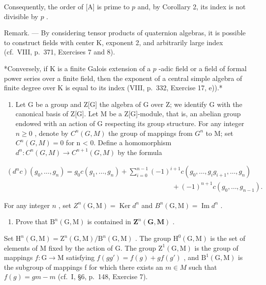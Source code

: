 Consequently, the order of {[}A{]} is prime to \(p\) and, by Corollary 2, its index is not divisible by \(p\) .

Remark. --- By considering tensor products of quaternion algebras, it is possible to construct fields with center K, exponent 2, and arbitrarily large index (cf.~VIII, p.~371, Exercises 7 and 8).

*Conversely, if K is a finite Galois extension of a \(p\) -adic field or a field of formal power series over a finite field, then the exponent of a central simple algebra of finite degree over K is equal to its index (VIII, p.~332, Exercise 17, e)).*


\begin{enumerate}
\def\labelenumi{\arabic{enumi})}
\tightlist
\item
  Let G be a group and Z{[}G{]} the algebra of G over Z; we identify G with the canonical basis of Z{[}G{]}. Let M be a Z{[}G{]}-module, that is, an abelian group endowed with an action of G respecting its group structure. For any integer \(n \geqslant 0\) , denote by \(C^{n}(G, M)\) the group of mappings from \(G^{n}\) to M; set \(C^{n}(G, M) = 0\) for n \textless{} 0. Define a homomorphism \(d^{n}: C^{n}(G, M) \to C^{n+1}(G, M)\) by the formula
\end{enumerate}

\[
\begin{array}{c} (d ^ {n} c) (g _ {0}, \ldots , g _ {n}) = g _ {0}   c (g _ {1}, \ldots , g _ {n}) + \sum_ {i = 0} ^ {n - 1} (- 1) ^ {i + 1} c (g _ {0}, \ldots , g _ {i} g _ {i + 1}, \ldots , g _ {n}) \\ \qquad \qquad \qquad \qquad \qquad \qquad \qquad \qquad \qquad \qquad \qquad \qquad + (- 1) ^ {n + 1} c (g _ {0}, \ldots , g _ {n - 1})  . \end{array}
\]

For any integer \(n\) , set \(Z^n(\mathrm{G},\mathrm{M}) = \operatorname{Ker} d^n\) and \(B^n(\mathrm{G},\mathrm{M}) = \operatorname{Im} d^n\) .

\begin{enumerate}
\def\labelenumi{\alph{enumi})}
\tightlist
\item
  Prove that \(\mathrm{B}^n (\mathrm{G},\mathrm{M})\) is contained in \(\mathbf{Z}^n (\mathbf{G},\mathbf{M})\) .
\end{enumerate}

Set \(\mathrm{H}^{n}(\mathrm{G},\mathrm{M})=\mathrm{Z}^{n}(\mathrm{G},\mathrm{M})/\mathrm{B}^{n}(\mathrm{G},\mathrm{M})\) . The group \(\mathrm{H}^{0}(\mathrm{G},\mathrm{M})\) is the set of elements of M fixed by the action of G. The group \(\mathrm{Z}^{1}(\mathrm{G},\mathrm{M})\) is the group of mappings \(f:\mathrm{G}\to\mathrm{M}\) satisfying \(f(gg')=f(g)+gf(g')\) , and \(\mathrm{B}^{1}(\mathrm{G},\mathrm{M})\) is the subgroup of mappings f for which there exists an \(m\in M\) such that \(f(g)=gm-m\) (cf.~I, §6, p.~148, Exercise 7).

